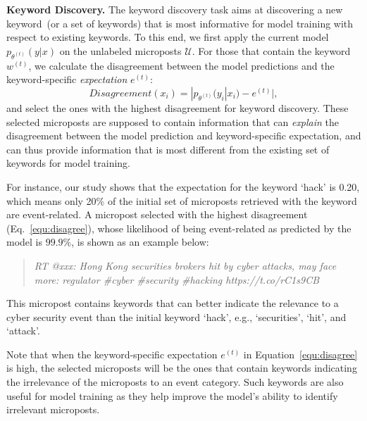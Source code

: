 \documentclass[letterpaper]{article}
\begin{document}
\smallskip
\noindent\textbf{Keyword Discovery.} The keyword discovery task aims at discovering a new keyword~(or a set of keywords) that is most informative for model training with respect to existing keywords. To this end, we first apply the current model $p_{\theta^{(t)}}(y|x)$ on the unlabeled microposts $\mathcal{U}$. For those that contain the keyword $w^{(t)}$, we calculate the disagreement between the model predictions and the keyword-specific \emph{expectation} $e^{(t)}$:
\begin{equation}
    Disagreement(x_i) = |p_{\theta^{(t)}}(y_i|x_i) - e^{(t)}|,
    \label{equ:disagree}
\end{equation}
and select the ones with the highest disagreement for keyword discovery. These selected microposts are supposed to contain information that can \emph{explain} the disagreement between the model prediction and keyword-specific expectation, and can thus provide information that is most different from the existing set of keywords for model training.

For instance, our study shows that the expectation for the keyword \lq hack' is 0.20, which means only 20\% of the initial set of microposts retrieved with the keyword are event-related. A micropost selected with the highest disagreement (Eq.~\ref{equ:disagree}), whose likelihood of being event-related as predicted by the model is $99.9\%$, is shown as an example below:

\begin{quote}
    \emph{RT @xxx: Hong Kong securities brokers hit by cyber attacks, may face more: regulator \#cyber \#security \#hacking https://t.co/rC1s9CB}
\end{quote}

\noindent This micropost contains keywords that can better indicate the relevance to a cyber security event than the initial keyword \lq hack', e.g., \lq securities', \lq hit', and \lq attack'.

Note that when the keyword-specific expectation $e^{(t)}$ in Equation~\ref{equ:disagree} is high, the selected microposts will be the ones that contain keywords indicating the irrelevance of the microposts to an event category. Such keywords are also useful for model training as they help improve the model's ability to identify irrelevant microposts.
\end{document}
